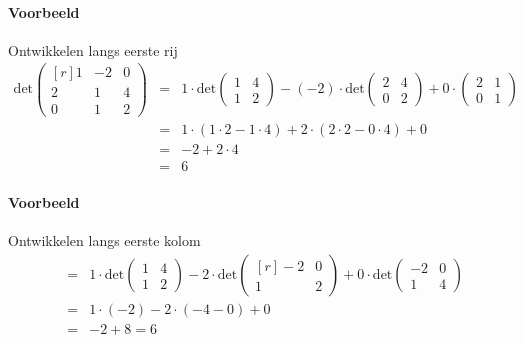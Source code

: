 \begin{enumerate}
	\paragraph{Voorbeeld} Ontwikkelen langs eerste rij
	\begin{eqnarray*}
		\mbox{det} \begin{pmatrix*}[r] 1 & -2 & 0 \\ 2 & 1 & 4 \\ 0 & 1 & 2 \end{pmatrix*} &=& 1 \cdot \mbox{det} \begin{pmatrix} 1 & 4 \\ 1 & 2 \end{pmatrix} - (-2) \cdot \mbox{det} \begin{pmatrix} 2 & 4 \\ 0 & 2 \end{pmatrix} + 0 \cdot \begin{pmatrix} 2 & 1 \\ 0 & 1 \end{pmatrix} \\
		&=& 1 \cdot (1 \cdot 2 - 1 \cdot 4) + 2 \cdot (2 \cdot 2 - 0 \cdot 4) + 0 \\
		&=& -2 + 2 \cdot 4 \\
		&=& 6
	\end{eqnarray*}
	\paragraph{Voorbeeld} Ontwikkelen langs eerste kolom
	\begin{eqnarray*}
		&=& 1 \cdot \mbox{det} \begin{pmatrix} 1 & 4 \\ 1 & 2 \end{pmatrix} - 2 \cdot \mbox{det} \begin{pmatrix*}[r] -2 & 0 \\ 1 & 2 \end{pmatrix*} + 0 \cdot \mbox{det} \begin{pmatrix*} -2 & 0 \\ 1 & 4 \end{pmatrix*} \\
		&=& 1 \cdot (-2) - 2 \cdot (-4 - 0) + 0 \\
		&=& -2 + 8 = 6
	\end{eqnarray*}


\end{enumerate}
